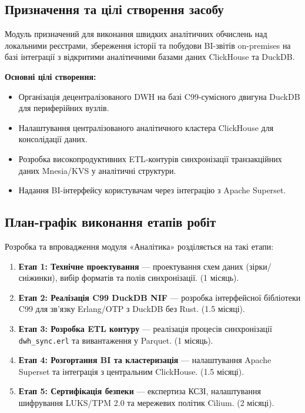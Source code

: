 \documentclass{article}
\begin{document}
\subsection{Призначення та цілі створення засобу}
Модуль призначений для виконання швидких аналітичних обчислень над локальними реєстрами, збереження історії та побудови BI-звітів on-premises на базі інтеграції з відкритими аналітичними базами даних ClickHouse та DuckDB.

\textbf{Основні цілі створення:}
\begin{itemize}
    \item Організація децентралізованого DWH на базі C99-сумісного двигуна DuckDB для периферійних вузлів.
    \item Налаштування централізованого аналітичного кластера ClickHouse для консолідації даних.
    \item Розробка високопродуктивних ETL-контурів синхронізації транзакційних даних Mnesia/KVS у аналітичні структури.
    \item Надання BI-інтерфейсу користувачам через інтеграцію з Apache Superset.
\end{itemize}

\subsection{План-графік виконання етапів робіт}
Розробка та впровадження модуля «Аналітика» розділяється на такі етапи:
\begin{enumerate}
    \item \textbf{Етап 1: Технічне проектування} --- проектування схем даних (зірки/сніжинки), вибір форматів та полів синхронізації. (1 місяць).
    \item \textbf{Етап 2: Реалізація C99 DuckDB NIF} --- розробка інтерфейсної бібліотеки C99 для зв'язку Erlang/OTP з DuckDB без Rust. (1.5 місяці).
    \item \textbf{Етап 3: Розробка ETL контуру} --- реалізація процесів синхронізації \texttt{dwh\_sync.erl} та вивантаження у Parquet. (1 місяць).
    \item \textbf{Етап 4: Розгортання BI та кластеризація} --- налаштування Apache Superset та інтеграція з центральним ClickHouse. (1.5 місяці).
    \item \textbf{Етап 5: Сертифікація безпеки} --- експертиза КСЗІ, налаштування шифрування LUKS/TPM 2.0 та мережевих політик Cilium. (2 місяці).
\end{enumerate}

\newpage
\end{document}
